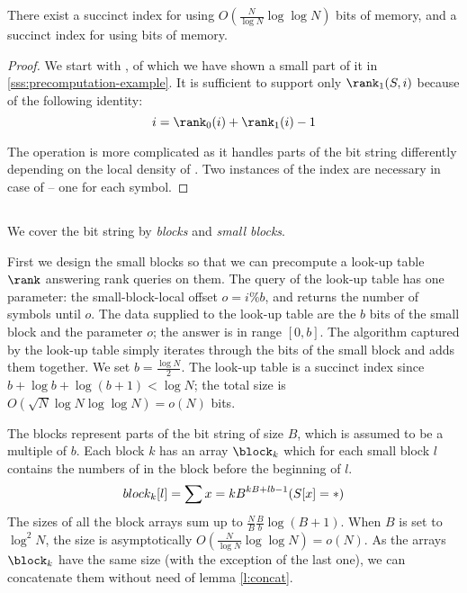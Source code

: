 \begin{thm}
	There exist a succinct index for \rank{} using $O(\frac{N}{\log N} \log \log N)$ bits of memory, and a succinct index for \select{} using  bits of memory.
\end{thm}
\begin{proof}
We start with \rank{}, of which we have shown a small part of it in \ref{sss:precomputation-example}.
It is sufficient to support only $\rank_1(S, i)$ because of the following identity:
$$ i = \rank_0(i) + \rank_1(i) - 1 $$

The operation \select{} is more complicated as it handles parts of the bit string differently depending on the local density of \ph.
Two instances of the index are necessary in case of \select{} -- one for each symbol.
\end{proof}

\subsection{\rank}\label{ss:rank}


We cover the bit string by \emph{blocks} and \emph{small blocks}.

First we design the small blocks so that we can precompute a look-up table $\rank$ answering rank queries on them.
The query of the look-up table has one parameter: the small-block-local offset $o = i \% b$, and returns the number of symbols \ph{} until $o$.
The data supplied to the look-up table are the $b$ bits of the small block and the parameter $o$; the answer is in range $[0, b]$.
The algorithm captured by the look-up table simply iterates through the bits of the small block and adds them together.
We set $b = \frac{\log N}{2}$.
The look-up table is a succinct index since $b + \log b + \log (b + 1) < \log N$; the total size is $O(\sqrt{N} \log N \log \log N) = o(N)$ bits.

The blocks represent parts of the bit string of size $B$, which is assumed to be a multiple of $b$.
Each block $k$ has an array $\block_k$ which for each small block $l$ contains the numbers of \ph in the block before the beginning of $l$.
$$ block_k[l] = \sum{x = k B}^{k B + l b - 1} (S[x] = \ph) $$
The sizes of all the block arrays sum up to $\frac{N}{B} \frac{B}{b} \log (B + 1)$.
When $B$ is set to $\log^2 N$, the size is asymptotically $O(\frac{N}{\log N} \log \log N) = o(N)$.
As the arrays $\block_k$ have the same size (with the exception of the last one), we can concatenate them without need of lemma \ref{l:concat}.

